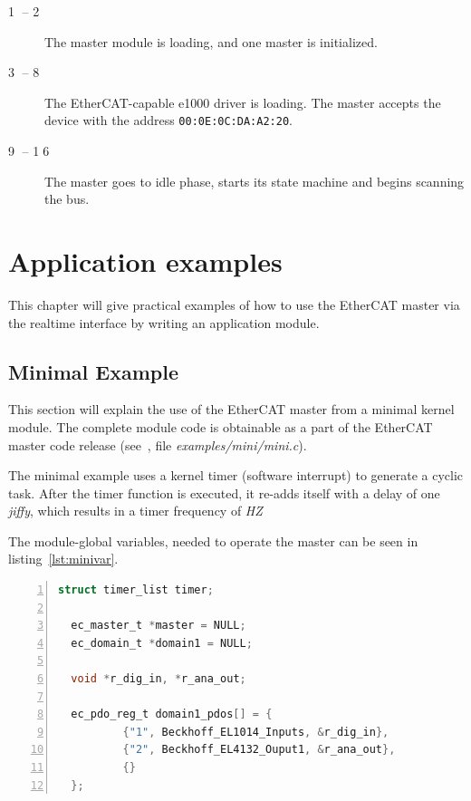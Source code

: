 \documentclass[a4paper,12pt,BCOR6mm,bibtotoc,idxtotoc]{scrbook}
\newcommand{\linenum}[1]{\normalfont\textcircled{\tiny #1}}
\begin{document}
\begin{description}

\item[\linenum{1} -- \linenum{2}] The master module is loading, and one master
is initialized.

\item[\linenum{3} -- \linenum{8}] The EtherCAT-capable e1000 driver is
loading. The master accepts the device with the address
\lstinline+00:0E:0C:DA:A2:20+.

\item[\linenum{9} -- \linenum{16}] The master goes to idle phase, starts its
state machine and begins scanning the bus.

\end{description}


\chapter{Application examples}
\label{chapter:examples}

This chapter will give practical examples of how to use the EtherCAT master via
the realtime interface by writing an application module.


\section{Minimal Example}
\label{sec:mini}

This section will explain the use of the EtherCAT master from a minimal kernel
module. The complete module code is obtainable as a part of the EtherCAT master
code release (see~\cite{etherlab}, file \textit{examples/mini/mini.c}).

The minimal example uses a kernel timer (software interrupt) to generate a
cyclic task. After the timer function is executed, it re-adds itself with a
delay of one \textit{jiffy}, which results in a timer frequency
of \textit{HZ}

The module-global variables, needed to operate the master can be seen
in listing~\ref{lst:minivar}.

\begin{lstlisting}[gobble=2,language=C,numbers=left,caption={Minimal
    variables},label=lst:minivar]
  struct timer_list timer;

  ec_master_t *master = NULL;
  ec_domain_t *domain1 = NULL;

  void *r_dig_in, *r_ana_out;

  ec_pdo_reg_t domain1_pdos[] = {
          {"1", Beckhoff_EL1014_Inputs, &r_dig_in},
          {"2", Beckhoff_EL4132_Ouput1, &r_ana_out},
          {}
  };
\end{lstlisting}
\end{document}
